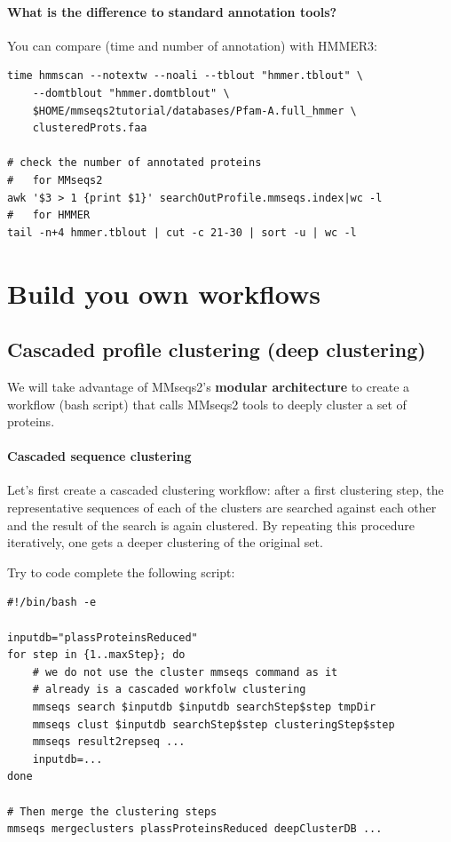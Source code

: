 \documentclass{scrartcl}
\begin{document}
\paragraph{What is the difference to standard annotation tools?}

You can compare (time and number of annotation) with HMMER3:
\begin{verbatim}
time hmmscan --notextw --noali --tblout "hmmer.tblout" \
    --domtblout "hmmer.domtblout" \
    $HOME/mmseqs2tutorial/databases/Pfam-A.full_hmmer \
    clusteredProts.faa 

# check the number of annotated proteins
#   for MMseqs2
awk '$3 > 1 {print $1}' searchOutProfile.mmseqs.index|wc -l
#   for HMMER
tail -n+4 hmmer.tblout | cut -c 21-30 | sort -u | wc -l 
\end{verbatim}


\section{Build you own workflows}
\subsection{Cascaded profile clustering (deep clustering)}
We will take advantage of MMseqs2's \textbf{modular architecture} to create a workflow (bash script) that calls MMseqs2 tools to deeply cluster a set of proteins. 

\paragraph{Cascaded sequence clustering} Let's first create a cascaded clustering workflow: after a first clustering step, the representative sequences of each of the clusters are searched against each other and the result of the search is again clustered. By repeating this procedure iteratively, one gets a deeper clustering of the original set.

Try to code complete the following script:
\begin{verbatim}
#!/bin/bash -e

inputdb="plassProteinsReduced"
for step in {1..maxStep}; do
    # we do not use the cluster mmseqs command as it
    # already is a cascaded workfolw clustering
    mmseqs search $inputdb $inputdb searchStep$step tmpDir
    mmseqs clust $inputdb searchStep$step clusteringStep$step
    mmseqs result2repseq ...
    inputdb=...
done

# Then merge the clustering steps
mmseqs mergeclusters plassProteinsReduced deepClusterDB ...
\end{verbatim}
\end{document}
